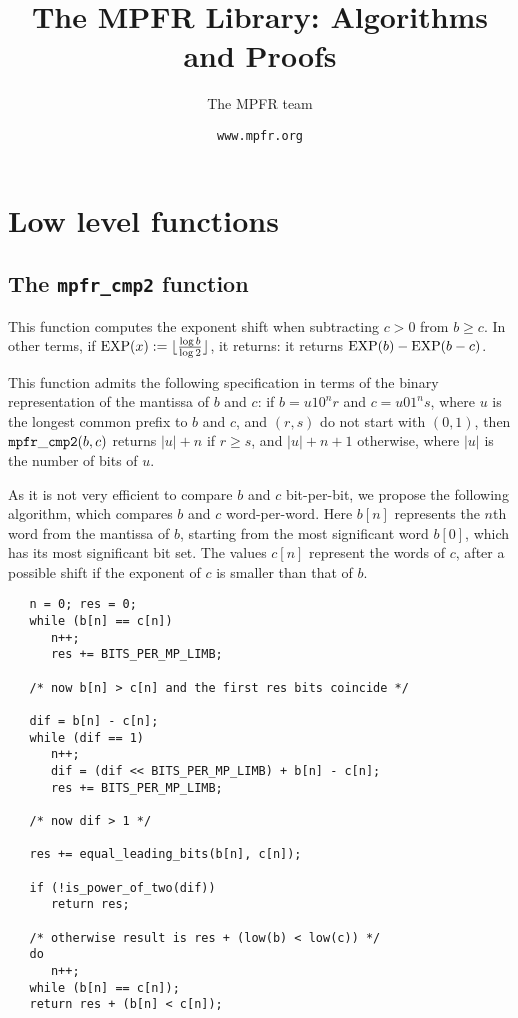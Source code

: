 \documentclass[12pt]{amsart}
\title{The MPFR Library: Algorithms and Proofs}
\author{The MPFR team}
\date{\tt www.mpfr.org}
\begin{document}
\maketitle

\section{Low level functions}

\subsection{The {\tt mpfr\_cmp2} function}

This function computes the exponent shift when subtracting $c > 0$ from
$b \ge c$. In other terms, if ${\rm EXP}(x) := 
\lfloor \frac{\log b}{\log 2} \rfloor$, it returns:
it returns ${\rm EXP}(b) - {\rm EXP}(b-c)$.

This function admits the following specification in terms of the binary
representation of the mantissa of $b$ and $c$: if $b = u 1 0^n r$ and
$c = u 0 1^n s$, where $u$ is the longest common prefix to $b$ and $c$,
and $(r,s)$ do not start with $(0, 1)$, then ${\tt mpfr\_cmp2}(b,c)$ returns
$|u| + n$ if $r \ge s$, and $|u| + n + 1$ otherwise, where $|u|$ is the number
of bits of $u$.

As it is not very efficient to compare $b$ and $c$ bit-per-bit, we propose
the following algorithm, which compares $b$ and $c$ word-per-word.
Here $b[n]$ represents the $n$th word from the mantissa of $b$, starting from
the most significant word $b[0]$, which has its most significant bit set.
The values $c[n]$ represent the words of $c$, after a possible shift if the
exponent of $c$ is smaller than that of $b$.
\begin{verbatim}
   n = 0; res = 0;
   while (b[n] == c[n])
      n++;
      res += BITS_PER_MP_LIMB;

   /* now b[n] > c[n] and the first res bits coincide */

   dif = b[n] - c[n];
   while (dif == 1)
      n++;
      dif = (dif << BITS_PER_MP_LIMB) + b[n] - c[n];
      res += BITS_PER_MP_LIMB;

   /* now dif > 1 */

   res += equal_leading_bits(b[n], c[n]);

   if (!is_power_of_two(dif))
      return res;

   /* otherwise result is res + (low(b) < low(c)) */
   do
      n++;
   while (b[n] == c[n]);
   return res + (b[n] < c[n]);
\end{verbatim}
\end{document}
